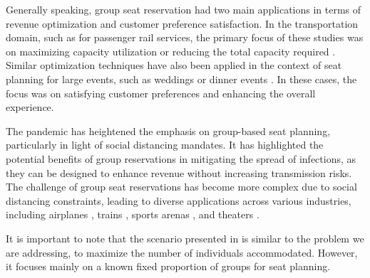 Generally speaking, group seat reservation had two main applications in terms of revenue optimization and customer preference satisfaction. In the transportation domain, such as for passenger rail services, the primary focus of these studies was on maximizing capacity utilization or reducing the total capacity required \cite{clausen2010off, deplano2019offline}. Similar optimization techniques have also been applied in the context of seat planning for large events, such as weddings or dinner events \cite{lewis2016creating}. In these cases, the focus was on satisfying customer preferences and enhancing the overall experience.



The pandemic has heightened the emphasis on group-based seat planning, particularly in light of social distancing mandates. It has highlighted the potential benefits of group reservations in mitigating the spread of infections, as they can be designed to enhance revenue without increasing transmission risks. The challenge of group seat reservations has become more complex due to social distancing constraints, leading to diverse applications across various industries, including airplanes \cite{salari2022social}, trains \cite{haque2023social}, sports arenas \cite{kwag2022optimal}, and theaters \cite{blom2022filling}.

It is important to note that the scenario presented in \cite{blom2022filling} is similar to the problem we are addressing, to maximize the number of individuals accommodated. However, it focuses mainly on a known fixed proportion of groups for seat planning.

